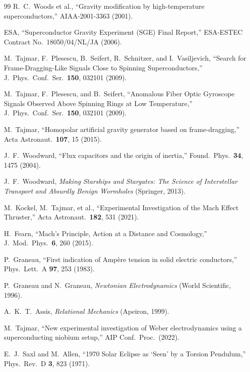 \documentclass[aps,prd,twocolumn,superscriptaddress,floatfix,nofootinbib]{revtex4-2}
\begin{document}
\begin{thebibliography}{99}
R.~C.~Woods et al., ``Gravity modification by high-temperature
superconductors,'' AIAA-2001-3363 (2001).

ESA, ``Superconductor Gravity Experiment (SGE) Final Report,''
ESA-ESTEC Contract No.\ 18050/04/NL/JA (2006).

M.~Tajmar, F.~Plesescu, B.~Seifert, R.~Schnitzer, and I.~Vasiljevich,
``Search for Frame-Dragging-Like Signals Close to Spinning
Superconductors,'' J.\ Phys.\ Conf.\ Ser.\ \textbf{150}, 032101
(2009).

M.~Tajmar, F.~Plesescu, and B.~Seifert, ``Anomalous Fiber Optic
Gyroscope Signals Observed Above Spinning Rings at Low Temperature,''
J.\ Phys.\ Conf.\ Ser.\ \textbf{150}, 032101 (2009).

M.~Tajmar, ``Homopolar artificial gravity generator based on
frame-dragging,'' Acta Astronaut.\ \textbf{107}, 15 (2015).

J.~F.~Woodward, ``Flux capacitors and the origin of inertia,''
Found.\ Phys.\ \textbf{34}, 1475 (2004).

J.~F.~Woodward, \textit{Making Starships and Stargates: The Science
of Interstellar Transport and Absurdly Benign Wormholes} (Springer,
2013).

M.~Kockel, M.~Tajmar, et al., ``Experimental Investigation of the
Mach Effect Thruster,'' Acta Astronaut.\ \textbf{182}, 531 (2021).

H.~Fearn, ``Mach's Principle, Action at a Distance and Cosmology,''
J.\ Mod.\ Phys.\ \textbf{6}, 260 (2015).

P.~Graneau, ``First indication of Amp\`ere tension in solid electric
conductors,'' Phys.\ Lett.\ A \textbf{97}, 253 (1983).

P.~Graneau and N.~Graneau, \textit{Newtonian Electrodynamics} (World
Scientific, 1996).

A.~K.~T.~Assis, \textit{Relational Mechanics} (Apeiron, 1999).

M.~Tajmar, ``New experimental investigation of Weber electrodynamics
using a superconducting niobium setup,'' AIP Conf.\ Proc.\ (2022).

E.~J.~Saxl and M.~Allen, ``1970 Solar Eclipse as `Seen' by a Torsion
Pendulum,'' Phys.\ Rev.\ D \textbf{3}, 823 (1971).


\end{thebibliography}
\end{document}
